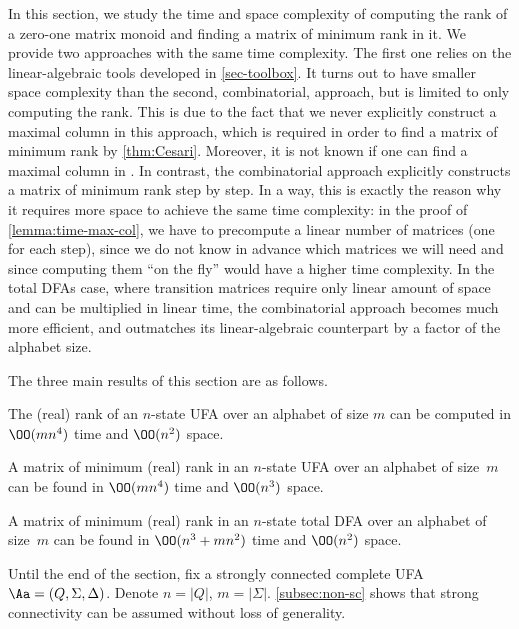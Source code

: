 In this section, we study the time and space complexity of computing the rank of a zero-one matrix monoid and finding a matrix of minimum rank in it. We provide two approaches with the same time complexity. The first one relies on the linear-algebraic tools developed in \autoref{sec-toolbox}. It turns out to have smaller space complexity than the second, combinatorial, approach, but is limited to only computing the rank. This is due to the fact that we never explicitly construct a maximal column in this approach, which is required in order to find a matrix of minimum rank by \autoref{thm:Cesari}. Moreover, it is not known if one can find a maximal column in \NC. In contrast, the combinatorial approach explicitly constructs a matrix of minimum rank step by step. In a way, this is exactly the reason why it requires more space to achieve the same time complexity: in the proof of \autoref{lemma:time-max-col}, we have to precompute a linear number of matrices (one for each step), since we do not know in advance which matrices we will need and since computing them ``on the fly'' would have a higher time complexity.
In the total DFAs case, where transition matrices require only linear amount of space and can be multiplied in linear time, the combinatorial approach becomes much more efficient, and outmatches its linear-algebraic counterpart by a factor of the alphabet size.

The three main results of this section are as follows.

\begin{thm}\label{thm:linalg-time}
    The (real) rank of an $n$-state UFA over an alphabet of size $m$ can be computed in $\OO(mn^4)$ time and $\OO(n^2)$ space. 
\end{thm}

\begin{thm}\label{thm:finding-matrix}
 A matrix of minimum (real) rank in an $n$-state UFA over an alphabet of size~$m$ can be found in  $\OO(mn^4)$ time and $\OO(n^3)$ space. 
\end{thm}

\begin{thm}\label{thm:main-dfas}
    A matrix of minimum (real) rank in an $n$-state total DFA over an alphabet of size~$m$ can be found in $\OO(n^3 + mn^2)$ time and $\OO(n^2)$ space.
\end{thm}

\noindent
Until the end of the section, fix a strongly connected complete UFA $\Aa = (Q, \Sigma, \Delta)$. Denote $n = |Q|$, $m = |\Sigma|$. \autoref{subsec:non-sc} shows that strong connectivity can be assumed without loss of generality.

